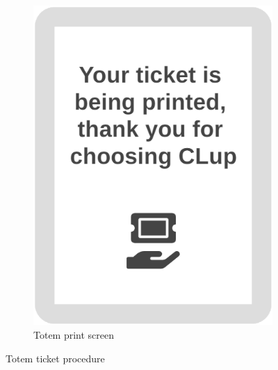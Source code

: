 \begin{figure}[h!]
\begin{subfigure}[b]{0.3\textwidth}
		\includegraphics[width=\linewidth]{../Diagrams/WireframesCLup/TotemPrint.png}
		\caption{Totem print screen}
		\label{fig:WfTotemPrint}
	\end{subfigure}
	\caption{Totem ticket procedure}
	\label{fig:Wireframes}
\end{figure}


